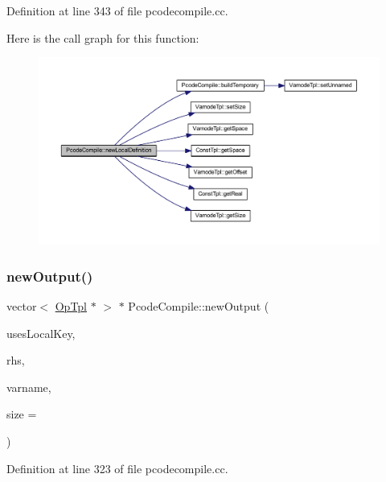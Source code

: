 Definition at line 343 of file pcodecompile.\+cc.

Here is the call graph for this function\+:
\nopagebreak
\begin{figure}[H]
\begin{center}
\leavevmode
\includegraphics[width=350pt]{class_pcode_compile_a6c0c8bb263b71750d0772e6c599ed59b_cgraph}
\end{center}
\end{figure}
\mbox{\label{class_pcode_compile_ac43f27f167fc5fdc1bb3531346dc6797}} 
\subsubsection{\texorpdfstring{newOutput()}{newOutput()}}
{\footnotesize\ttfamily vector$<$ \mbox{\hyperlink{class_op_tpl}{Op\+Tpl}} $\ast$ $>$ $\ast$ Pcode\+Compile\+::new\+Output (\begin{DoxyParamCaption}\item[{bool}]{uses\+Local\+Key,  }\item[{\mbox{\hyperlink{class_expr_tree}{Expr\+Tree}} $\ast$}]{rhs,  }\item[{string $\ast$}]{varname,  }\item[{uint4}]{size = {} }\end{DoxyParamCaption})}



Definition at line 323 of file pcodecompile.\+cc.

